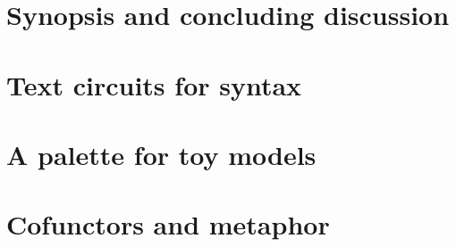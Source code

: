 



\maketitle%

\tableofcontents{}

\setcounter{chapter}{-1}
\chapter{Synopsis and concluding discussion}
\newpage

\newpage


\chapter{Text circuits for syntax}\label{chapter:textcircuits}
\newpage
\label{sec:ncat}
\newpage

\newpage

\newpage

\chapter{A palette for toy models}\label{chapter:contrel}
\newpage

\newpage

\newpage

\newpage

\newpage
\label{sec:topconcepts}

\newpage
\chapter{Cofunctors and metaphor}\label{chapter:sketches}
\newpage
\label{sec:miracle}
\newpage
\label{sec:metaphor}

\newpage
\begin{appendix}
\newpage
\label{sec:proctheory}
\newpage
\label{sec:miracle}
\newpage

\newpage

\newpage

\end{appendix}








